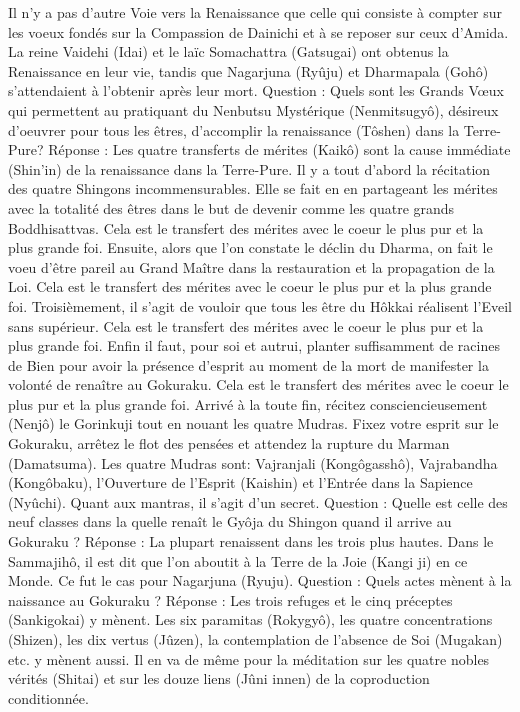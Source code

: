 Il n’y a pas d’autre Voie vers la Renaissance que celle qui consiste à compter sur les voeux fondés sur la Compassion de Dainichi et à se reposer sur ceux d’Amida.  La reine Vaidehi (Idai) et le laïc Somachattra (Gatsugai) ont obtenus la Renaissance en leur vie, tandis que Nagarjuna (Ryûju) et Dharmapala (Gohô) s'attendaient à l’obtenir après leur mort.
Question : Quels sont les Grands Vœux qui permettent au pratiquant du Nenbutsu Mystérique (Nenmitsugyô), désireux d’oeuvrer pour tous les êtres, d'accomplir la renaissance (Tôshen) dans la Terre-Pure?
Réponse : Les quatre transferts de mérites (Kaikô) sont la cause immédiate (Shin’in) de la renaissance dans la Terre-Pure.
Il y a tout d’abord la récitation des quatre Shingons incommensurables. Elle se fait en en partageant les mérites avec la totalité des êtres dans le but de devenir comme les quatre grands Boddhisattvas. Cela est le transfert des mérites avec le coeur le plus pur et la plus grande foi. 
Ensuite, alors que l'on constate le déclin du Dharma, on fait le voeu d’être pareil au Grand Maître dans la restauration et la propagation de la Loi. Cela est le transfert des mérites avec le coeur le plus pur et la plus grande foi. 
Troisièmement, il s’agit de vouloir que tous les être du Hôkkai réalisent l’Eveil sans supérieur. Cela est le transfert des mérites avec le coeur le plus pur et la plus grande foi. 
Enfin il faut, pour soi et autrui, planter suffisamment de racines de Bien pour avoir la présence d'esprit au moment de la mort de manifester la volonté de renaître au Gokuraku. Cela est le transfert des mérites avec le coeur le plus pur et la plus grande foi. 
Arrivé à la toute fin, récitez consciencieusement (Nenjô) le Gorinkuji tout en nouant les quatre Mudras. Fixez votre esprit sur le Gokuraku, arrêtez le flot des pensées et attendez la rupture du Marman (Damatsuma). 
Les quatre Mudras sont: Vajranjali (Kongôgasshô), Vajrabandha (Kongôbaku), l'Ouverture de l’Esprit (Kaishin) et l'Entrée dans la Sapience (Nyûchi). Quant aux mantras, il s’agit d’un secret.
Question : Quelle est celle des neuf classes dans la quelle renaît le Gyôja du Shingon quand il arrive au Gokuraku ?
Réponse : La plupart renaissent dans les trois plus hautes. Dans le Sammajihô, il est dit que l'on aboutit à la Terre de la Joie (Kangi ji) en ce Monde. Ce fut le cas pour Nagarjuna (Ryuju).
Question : Quels actes mènent à la naissance au Gokuraku ?
Réponse : Les trois refuges et le cinq préceptes (Sankigokai) y mènent. Les six paramitas (Rokygyô), les quatre concentrations (Shizen), les dix vertus (Jûzen), la contemplation de l'absence de Soi (Mugakan) etc. y mènent aussi. Il en va de même pour la méditation sur les quatre nobles vérités (Shitai) et sur les douze liens (Jûni innen) de la coproduction conditionnée.
